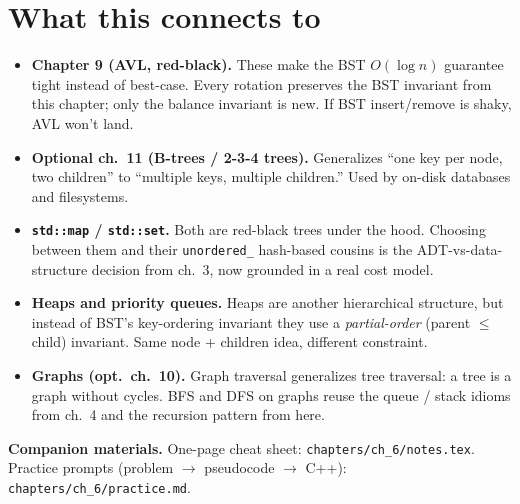 \documentclass[11pt]{article}
\begin{document}
\section*{What this connects to}

\begin{notebox}
\begin{itemize}
    \item \textbf{Chapter 9 (AVL, red-black).} These make the BST
    $O(\log n)$ guarantee tight instead of best-case. Every rotation
    preserves the BST invariant from this chapter; only the balance
    invariant is new. If BST insert/remove is shaky, AVL won't land.
    \item \textbf{Optional ch.~11 (B-trees / 2-3-4 trees).} Generalizes
    ``one key per node, two children'' to ``multiple keys, multiple
    children.'' Used by on-disk databases and filesystems.
    \item \textbf{\texttt{std::map} / \texttt{std::set}.} Both are
    red-black trees under the hood. Choosing between them and their
    \texttt{unordered\_} hash-based cousins is the ADT-vs-data-structure
    decision from ch.~3, now grounded in a real cost model.
    \item \textbf{Heaps and priority queues.} Heaps are another
    hierarchical structure, but instead of BST's key-ordering invariant
    they use a \emph{partial-order} (parent $\leq$ child) invariant.
    Same node + children idea, different constraint.
    \item \textbf{Graphs (opt.\ ch.~10).} Graph traversal generalizes
    tree traversal: a tree is a graph without cycles. BFS and DFS on
    graphs reuse the queue / stack idioms from ch.~4 and the recursion
    pattern from here.
\end{itemize}
\end{notebox}

\textbf{Companion materials.} One-page cheat sheet:
\texttt{chapters/ch\_6/notes.tex}. Practice prompts (problem $\to$
pseudocode $\to$ C++): \texttt{chapters/ch\_6/practice.md}.
\end{document}
